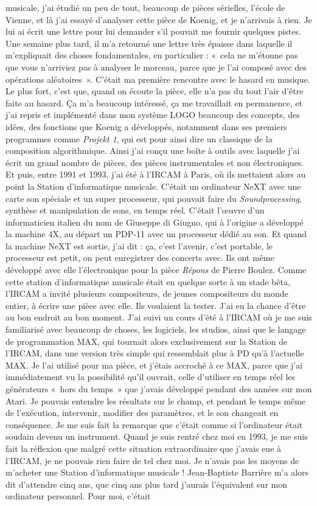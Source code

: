 \documentclass[a4paper,12pt]{article}
\newcommand{\guill}[1]{«~#1~»}
\begin{document}
musicale, j'ai étudié un peu de tout, beaucoup de pièces sérielles, l'école de Vienne, et là j'ai essayé d'analyser cette pièce de Koenig, et je n'arrivais à rien. Je lui ai écrit une lettre pour lui demander s'il pouvait me fournir quelques pistes. Une semaine plus tard, il m'a retourné une lettre très épaisse dans laquelle il m'expliquait des choses fondamentales, en particulier : \guill{cela ne m'étonne pas que vous n'arriviez pas à analyser le morceau, parce que je l'ai composé avec des opérations aléatoires}. C'était ma première rencontre avec le hasard en musique. Le plus fort, c'est que, quand on écoute la pièce, elle n'a pas du tout l'air d'être faite au hasard. Ça m'a beaucoup intéressé, ça me travaillait en permanence, et j'ai repris et implémenté dans mon système LOGO beaucoup des concepts, des idées, des fonctions que Koenig a développés, notamment dans ses premiers programmes comme \emph{Projekt 1}, qui est pour ainsi dire un classique de la composition algorithmique. Ainsi j'ai conçu une boîte à outils avec laquelle j'ai écrit un grand nombre de pièces, des pièces instrumentales et non électroniques. Et puis, entre 1991 et 1993, j'ai été à l'IRCAM à Paris, où ils mettaient alors au point la Station d'informatique musicale. C'était un ordinateur NeXT avec une carte son spéciale et un super processeur, qui pouvait faire du \emph{Soundprocessing}, synthèse et manipulation de sons, en temps réel. C'était l'œuvre d'un informaticien italien du nom de Giuseppe di Giugno, qui à l'origine a développé la machine 4X, au départ un PDP-11 avec un processeur dédié au son. Et quand la machine NeXT est sortie, j'ai dit : ça, c'est l'avenir, c'est portable, le processeur est petit, on peut enregistrer des concerts avec. Ils ont même développé avec elle l'électronique pour la pièce \emph{Répons} de Pierre Boulez. Comme cette station d'informatique musicale était en quelque sorte à un stade bêta, l'IRCAM a invité plusieurs compositeurs, de jeunes compositeurs du monde entier, à écrire une pièce avec elle. Ils voulaient la tester. J'ai eu la chance d'être au bon endroit au bon moment. J'ai suivi un cours d'été à l'IRCAM où je me suis familiarisé avec beaucoup de choses, les logiciels, les studios, ainsi que le langage de programmation MAX, qui tournait alors exclusivement sur la Station de l'IRCAM, dans une version très simple qui ressemblait plus à PD qu'à l'actuelle MAX. Je l'ai utilisé pour ma pièce, et j'étais accroché à ce MAX, parce que j'ai immédiatement vu la possibilité qu'il ouvrait, celle d'utiliser en temps réel les générateurs \guill{hors du temps} que j'avais développé pendant des années sur mon Atari. Je pouvais entendre les résultats sur le champ, et pendant le temps même de l'exécution, intervenir, modifier des paramètres, et le son changeait en conséquence. Je me suis fait la remarque que c'était comme si l'ordinateur était soudain devenu un instrument. Quand je suis rentré chez moi en 1993, je me suis fait la réflexion que malgré cette situation extraordinaire que j'avais eue à l'IRCAM, je ne pouvais rien faire de tel chez moi. Je n'avais pas les moyens de m'acheter une Station d'informatique musicale ! Jean-Baptiste Barrière m'a alors dit d'attendre cinq ans, que cinq ans plus tard j'aurais l'équivalent sur mon ordinateur personnel. Pour moi, c'était 
\end{document}
